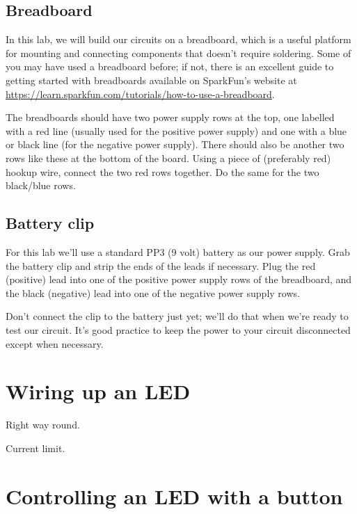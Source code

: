 \documentclass{article}
\begin{document}
\subsection{Breadboard}

In this lab, we will build our circuits on a breadboard, which is a useful
platform for mounting and connecting components that doesn't require soldering.
Some of you may have used a breadboard before; if not, there is an excellent
guide to getting started with breadboards available on SparkFun's website at
\url{https://learn.sparkfun.com/tutorials/how-to-use-a-breadboard}.

The breadboards should have two power supply rows at the top, one labelled with
a red line (usually used for the positive power supply) and one with a blue or
black line (for the negative power supply). There should also be another two
rows like these at the bottom of the board. Using a piece of (preferably red)
hookup wire, connect the two red rows together. Do the same for the two
black/blue rows.

\subsection{Battery clip}

For this lab we'll use a standard PP3 (9 volt) battery as our power supply.
Grab the battery clip and strip the ends of the leads if necessary. Plug the
red (positive) lead into one of the positive power supply rows of the
breadboard, and the black (negative) lead into one of the negative power supply
rows.

Don't connect the clip to the battery just yet; we'll do that when we're ready
to test our circuit. It's good practice to keep the power to your circuit
disconnected except when necessary.

\section{Wiring up an LED}


Right way round.

Current limit.

\section{Controlling an LED with a button}
\end{document}
